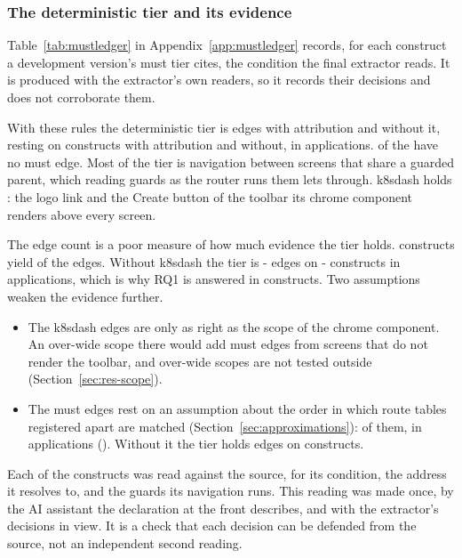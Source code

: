 \subsubsection{The deterministic tier and its evidence}

Table~\ref{tab:mustledger} in Appendix~\ref{app:mustledger} records, for each construct a
development version's must tier cites, the condition the final extractor reads. It is produced with the extractor's own readers, so it records their
decisions and does not corroborate them.

With these rules the deterministic tier is \CensusMust{} edges with attribution and \CensusBaseMust{}
without it, resting on \CensusMustSites{} constructs with attribution and \CensusBaseMustSites{}
without, in \CensusMustApps{} applications. \CensusZeroMustApps{} of the \CensusApps{} have no must
edge. Most of the tier is navigation between screens that share a guarded parent, which reading guards as
the router runs them lets through. k8sdash holds \CensusMustKdash{}: the logo link and the Create button
of the toolbar its chrome component renders above every screen.

The edge count is a poor measure of how much evidence the tier holds. \CensusMustSitesKdash{}
constructs yield \CensusMustKdash{} of the \CensusMust{} edges. Without k8sdash the tier is \the\numexpr\CensusMust-\CensusMustKdash\relax{} edges on
\the\numexpr\CensusMustSites-\CensusMustSitesKdash\relax{} constructs in
\the\numexpr{}\relax{} applications, which is why RQ1 is answered in constructs. Two
assumptions weaken the evidence further.

\begin{itemize}
\item The k8sdash edges are only as right as the scope of the chrome component. An over-wide scope
there would add must edges from screens that do not render the toolbar, and over-wide scopes are not
tested outside \GTApp{} (Section~\ref{sec:res-scope}).
\item The must edges rest on an assumption about the order in which route tables registered apart
are matched (Section~\ref{sec:approximations}): \RouteOrderResting{} of them, in
\RouteOrderRestingApps{} applications (\RouteOrderRestingWhere{}). Without it the tier holds
\RouteOrderMustWithout{} edges on \RouteOrderSitesWithout{} constructs.
\end{itemize}

Each of the \CensusMustSites{} constructs was read against the source, for its condition, the address it
resolves to, and the guards its navigation runs. This reading was made once, by the AI assistant the
declaration at the front describes, and with the extractor's decisions in view. It is a check that
each decision can be defended from the source, not an independent second reading.

